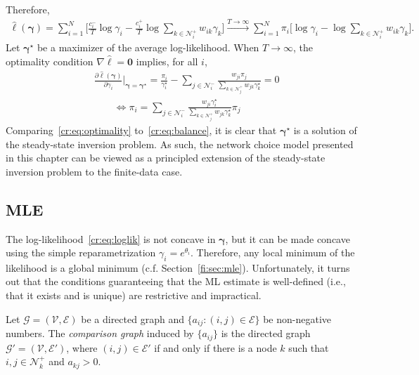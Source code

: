 Therefore,
\begin{align*}
\hat{\ell}(\bm{\gamma})
    = \sum_{i = 1}^N \bigg[ \frac{c^-_i}{T} \log \gamma_i - \frac{c^+_i}{T} \log \sum_{k \in \mathcal{N}^+_i} w_{ik} \gamma_k \bigg]
    \xrightarrow{T \to \infty} \sum_{i = 1}^N \pi_i \bigg[ \log \gamma_i - \log \sum_{k \in \mathcal{N}^+_i} w_{ik} \gamma_k \bigg].
\end{align*}
Let $\bm{\gamma}^\star$ be a maximizer of the average log-likelihood.
When $T \to \infty$, the optimality condition $\nabla \hat{\ell} = \bm{0}$ implies, for all $i$,
\begin{align}
&\frac{\partial \hat{\ell}(\bm{\gamma})}{\partial \gamma_i} \bigg|_{\bm{\gamma} = \bm{\gamma}^\star}
    = \frac{\pi_i}{\gamma^\star_i} - \sum_{j \in \mathcal{N}^-_i} \frac{w_{ji} \pi_j}{\sum_{k \in \mathcal{N}^+_j} w_{jk} \gamma^\star_k}
    = 0 \nonumber \\
&\qquad \iff \pi_i = \sum_{j \in \mathcal{N}^-_i} \frac{w_{ji} \gamma^\star_i}{\sum_{k \in \mathcal{N}^+_j} w_{jk} \gamma^\star_k} \pi_j \label{cr:eq:optimality}
\end{align}
Comparing~\eqref{cr:eq:optimality} to~\eqref{cr:eq:balance}, it is clear that $\bm{\gamma}^\star$ is a solution of the steady-state inversion problem.
As such, the network choice model presented in this chapter can be viewed as a principled extension of the steady-state inversion problem to the finite-data case.


\subsection{MLE}
\label{cr:sec:maxlik}

The log-likelihood~\eqref{cr:eq:loglik} is not concave in $\bm{\gamma}$, but it can be made concave using the simple reparametrization $\gamma_i = e^{\theta_i}$.
Therefore, any local minimum of the likelihood is a global minimum (c.f. Section~\ref{fi:sec:mle}).
Unfortunately, it turns out that the conditions guaranteeing that the ML estimate is well-defined (i.e., that it exists and is unique) are restrictive and impractical.

\begin{definition}
Let $\mathcal{G} = (\mathcal{V}, \mathcal{E})$ be a directed graph and $\{ a_{ij} : (i,j) \in \mathcal{E} \}$ be non-negative numbers.
The \emph{comparison graph} induced by $\{ a_{ij} \}$ is the directed graph $\mathcal{G}' = (\mathcal{V}, \mathcal{E}')$, where $(i,j) \in \mathcal{E}'$ if and only if there is a node $k$ such that $i, j \in \mathcal{N}^+_k$ and $a_{kj} > 0$.
\end{definition}

